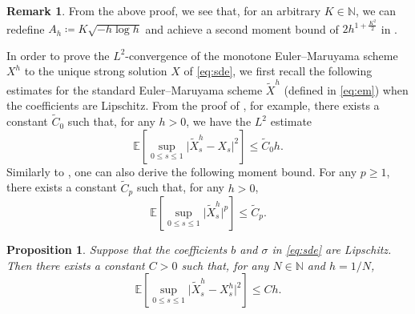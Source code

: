 \documentclass[oneside]{amsart}
\newtheorem{proposition}[theorem]{Proposition}
\theoremstyle{definition}
\newtheorem{remark}[theorem]{Remark}
\newcommand{\N}{\mathbb N}
\def\E{{\mathbb E}}
\numberwithin{equation}{section}
\begin{document}
\begin{remark}\label{rem:moment-bound}
	From the above proof, we see that, for an arbitrary $K \in \N$, we can redefine $A_h\coloneqq  K \sqrt{-h\log h}$ and achieve a second moment bound of $2 h^{1 + \frac{K^2}{2}}$ in .
\end{remark}

In order to prove the $L^2$-convergence of the monotone Euler--Maruyama scheme $X^h$ to the unique strong solution $X$ of \eqref{eq:sde}, we first recall the following estimates for the standard Euler--Maruyama scheme $\tilde{X}^h$ (defined in \eqref{eq:em}) when the coefficients are Lipschitz.
From the proof of \cite[Theorem~10.2.2]{KlPl92}, for example, there exists a constant $\tilde{C}_0$ such that, for any $h > 0$, we have the $L^2$ estimate 
\begin{equation}\label{eq:euler-convergence}
	\E \!\left[ \sup_{0 \leq s \leq 1} \lvert \tilde{X}^h_s - X_s \rvert^2 \right] \leq \tilde{C}_0 h.
\end{equation}
Similarly to , one can also derive the following moment bound. For any $p \geq 1$, there exists a constant $\tilde{C}_p$ such that, for any $h > 0$,
\begin{equation}\label{eq:euler-l2-bound}
	\E \!\left[ \sup_{0 \leq s \leq 1} \lvert \tilde{X}^h_s\rvert^p\right] \leq \tilde{C}_p.
\end{equation}



\begin{proposition}\label{prop:truncated-euler-close-to-euler}
	Suppose that the coefficients $b$ and $\sigma$ in \eqref{eq:sde} are Lipschitz. Then there exists a constant $C > 0$ such that, for any $N \in \N$ and $h = 1/N$,
	\begin{equation}
		\E \!\left[\sup_{0 \leq s \leq 1} \lvert \tilde{X}^h_s - X^h_s\rvert^2\right] \leq C h.
	\end{equation}
\end{proposition}
\end{document}
